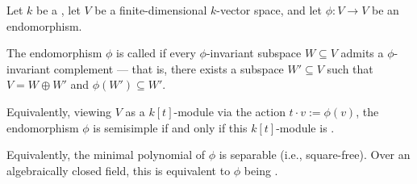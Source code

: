 \begin{definition} \label{definition:semisimple_endomorphism_of_a_vector_space_over_a_field}
Let $k$ be a , let $V$ be a finite-dimensional $k$-vector space, and let $\phi : V \to V$ be an endomorphism.

The endomorphism $\phi$ is called  if every $\phi$-invariant subspace $W \subseteq V$ admits a $\phi$-invariant complement — that is, there exists a subspace $W' \subseteq V$ such that $V = W \oplus W'$ and $\phi(W') \subseteq W'$.

Equivalently, viewing $V$ as a $k[t]$-module via the action $t \cdot v := \phi(v)$, the endomorphism $\phi$ is semisimple if and only if this $k[t]$-module is .

Equivalently, the minimal polynomial of $\phi$ is separable (i.e., square-free). Over an algebraically closed field, this is equivalent to $\phi$ being .
\end{definition}
